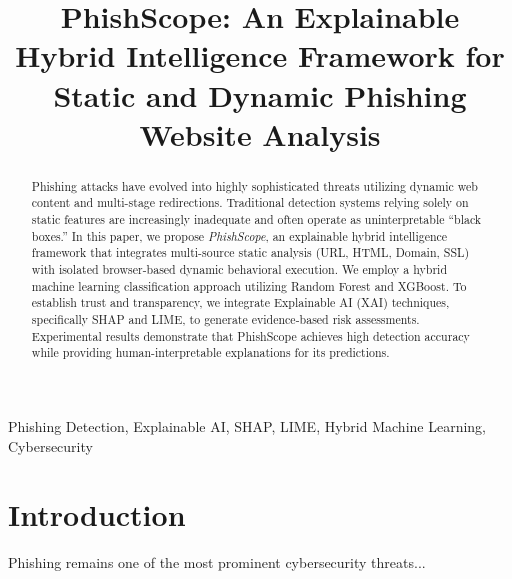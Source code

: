 \documentclass[conference]{IEEEtran}
\begin{document}
\title{PhishScope: An Explainable Hybrid Intelligence Framework for Static and Dynamic Phishing Website Analysis}

\author{
\and
{}
}

\maketitle

\begin{abstract}
Phishing attacks have evolved into highly sophisticated threats utilizing dynamic web content and multi-stage redirections. Traditional detection systems relying solely on static features are increasingly inadequate and often operate as uninterpretable ``black boxes.'' In this paper, we propose \textit{PhishScope}, an explainable hybrid intelligence framework that integrates multi-source static analysis (URL, HTML, Domain, SSL) with isolated browser-based dynamic behavioral execution. We employ a hybrid machine learning classification approach utilizing Random Forest and XGBoost. To establish trust and transparency, we integrate Explainable AI (XAI) techniques, specifically SHAP and LIME, to generate evidence-based risk assessments. Experimental results demonstrate that PhishScope achieves high detection accuracy while providing human-interpretable explanations for its predictions.
\end{abstract}

\begin{IEEEkeywords}
Phishing Detection, Explainable AI, SHAP, LIME, Hybrid Machine Learning, Cybersecurity
\end{IEEEkeywords}

\section{Introduction}
Phishing remains one of the most prominent cybersecurity threats...
\end{document}
